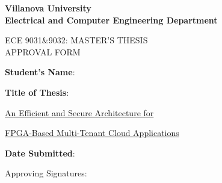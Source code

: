 

\newcommand{\ulfrule}[1]{\uline{#1\hfill}}


\begin{center}
\bfseries
Villanova University\\
Electrical and Computer Engineering Department

\vspace{1cm}

\uppercase{ECE 9031\&9032: Master's Thesis\\ Approval Form}
\end{center}

\vspace*{0.30cm} 
\noindent \textbf{Student's Name}: \underline{} \\ %
  
\vspace{1cm}
\noindent

\noindent \textbf{ Title of Thesis}: 
\parbox{260pt}{
	\ulfrule{\quad An Efficient and Secure Architecture for}
	
	\ulfrule{\null\quad FPGA-Based Multi-Tenant Cloud Applications}
}

\vspace{1cm}
\noindent
\noindent \textbf{Date Submitted}: \underline{} \ 


\vspace{1cm}
\noindent Approving Signatures:\\
\vspace{.5in}



